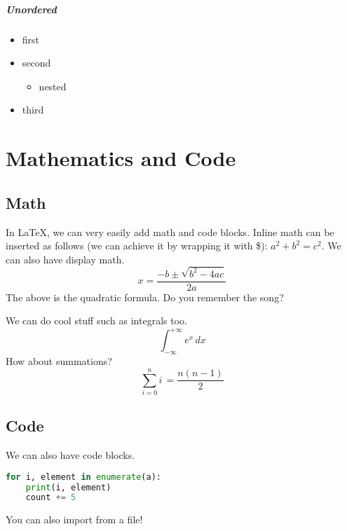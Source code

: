 \documentclass[]{report}
\begin{document}
\paragraph{Unordered}
\begin{itemize}
    \item first
    \item second
    \begin{itemize}
        \item nested
    \end{itemize}
    \item third
\end{itemize}

\chapter{Mathematics and Code}

\section{Math}
In \LaTeX, we can very easily add math and code blocks. Inline math can be inserted as follows (we can achieve it by wrapping it with \$): $a^{2} + b^{2} = c^{2}$. We can also have display math.
\[
    x = \frac{-b \pm \sqrt{b^{2} - 4ac}}{2a}
\]
The above is the quadratic formula. Do you remember the song?

We can do cool stuff such as integrals too.
\[
  \int_{-\infty}^{+\infty} e^{x} \, dx
\]
How about summations?
\[
  \sum_{i=0}^{n} i \, = \frac{n(n-1)}{2}
\]

\section{Code}
We can also have code blocks.

\begin{lstlisting}[language=Python]
for i, element in enumerate(a):
    print(i, element)
    count += 5
\end{lstlisting}

You can also import from a file!

\end{document}
